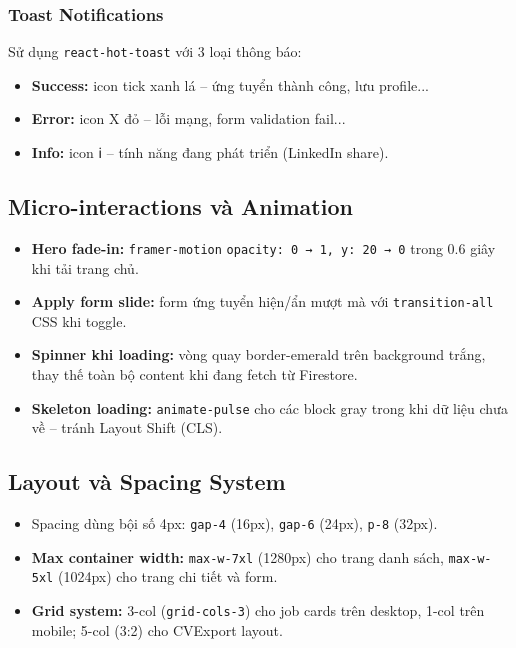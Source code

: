 \subsubsection{Toast Notifications}

Sử dụng \texttt{react-hot-toast} với 3 loại thông báo:
\begin{itemize}
  \item \textbf{Success:} icon tick xanh lá -- ứng tuyển thành công, lưu profile...
  \item \textbf{Error:} icon X đỏ -- lỗi mạng, form validation fail...
  \item \textbf{Info:} icon ℹ️ -- tính năng đang phát triển (LinkedIn share).
\end{itemize}

\subsection{Micro-interactions và Animation}

\begin{itemize}
  \item \textbf{Hero fade-in:} \texttt{framer-motion} \texttt{opacity: 0 → 1, y: 20 → 0}
    trong 0.6 giây khi tải trang chủ.
  \item \textbf{Apply form slide:} form ứng tuyển hiện/ẩn mượt mà với
    \texttt{transition-all} CSS khi toggle.
  \item \textbf{Spinner khi loading:} vòng quay border-emerald trên background trắng,
    thay thế toàn bộ content khi đang fetch từ Firestore.
  \item \textbf{Skeleton loading:} \texttt{animate-pulse} cho các block gray trong khi
    dữ liệu chưa về -- tránh Layout Shift (CLS).
\end{itemize}

\subsection{Layout và Spacing System}

\begin{itemize}
  \item Spacing dùng bội số 4px: \texttt{gap-4} (16px), \texttt{gap-6} (24px),
    \texttt{p-8} (32px).
  \item \textbf{Max container width:} \texttt{max-w-7xl} (1280px) cho trang danh sách,
    \texttt{max-w-5xl} (1024px) cho trang chi tiết và form.
  \item \textbf{Grid system:} 3-col (\texttt{grid-cols-3}) cho job cards trên desktop,
    1-col trên mobile; 5-col (3:2) cho CVExport layout.
\end{itemize}
